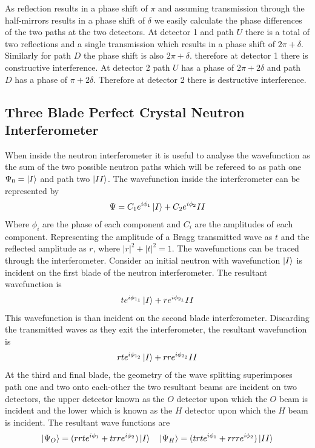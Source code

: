 As reflection results in a phase shift of $\pi$ and assuming transmission through the half-mirrors results in a phase shift of $\delta$ we easily calculate the phase differences of the two paths at the two detectors. At detector 1 and path $U$ there is a total of two reflections and a single transmission which results in a phase shift of $2\pi+\delta$. Similarly for path $D$ the phase shift is also $2\pi + \delta$. therefore at detector 1 there is constructive interference. At detector 2 path $U$ has a phase of $2\pi + 2\delta$ and path $D$ has a phase of $\pi + 2\delta$. Therefore at detector 2 there is destructive interference.\cite{dimaThesis}

\subsection{Three Blade Perfect Crystal Neutron Interferometer}
When inside the neutron interferometer it is useful to analyse the wavefunction as the sum of the two possible neutron paths which will be refereed to as path one $\Psi_0 = \Ket{I}$ and path two $\Ket{II}$. The wavefunction inside the interferometer can be represented by\cite{dimaThesis} 
\begin{equation*}
\Psi = C_1e^{i\phi_1}\Ket{I} + C_2e^{i\phi_2}{II}
\end{equation*}
Where $\phi_i$ are the phase of each component and $C_i$ are the amplitudes of each component. Representing the amplitude of a Bragg transmitted wave as $t$ and the reflected amplitude as $r$, where $|r|^2+|t|^2 = 1$. The wavefunctions can be traced through the interferometer. Consider an initial neutron with wavefunction $\Ket{I}$ is incident on the first blade of the neutron interferometer. The resultant wavefunction is 
$$ te^{i\phi_{1_1}}\Ket{I} + re^{i\phi_{2_1}}{II}$$
This wavefunction is than incident on the second blade interferometer. Discarding the transmitted waves as they exit the interferometer, the resultant wavefunction is 
$$rte^{i\phi_{1_2}}\Ket{I} + rre^{i\phi_{2_2}}{II}$$
At the third and final blade, the geometry of the wave splitting superimposes path one and two onto each-other the two resultant beams are incident on two detectors, the upper detector known as the $O$ detector upon which the $O$ beam is incident and the lower which is known as the $H$ detector upon which the $H$ beam is incident. The resultant wave functions are 
\begin{equation}
\Ket{\Psi_O} = (rrte^{i\phi_1}+trre^{i\phi_2}) \Ket{I} \,\,\,\,\,\, \Ket{\Psi_H} = (trte^{i\phi_1}+rrre^{i\phi_2})\Ket{II}
\label{eq:beams}
\end{equation}
